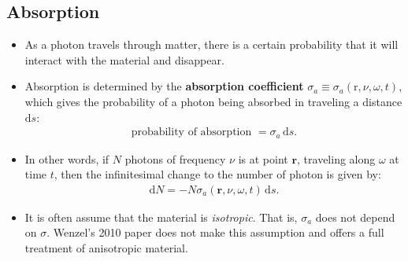 \documentclass[10pt]{article}
\newcommand{\dee}{\mathrm{d}}
\newcommand{\ve}[1]{\mathbf{#1}}
\begin{document}
  \subsection{Absorption}
  \begin{itemize}
    \item As a photon travels through matter, there is a certain probability that it will interact with the material and disappear.

    \item Absorption is determined by the \textbf{absorption coefficient} $\sigma_a \equiv \sigma_a(\mathrm{r}, \nu, \omega, t)$, which gives the probability of a photon being absorbed in traveling a distance $\dee s$:
    \begin{align*}
      \mbox{probability of absorption } = \sigma_a\, \dee s.
    \end{align*}

    \item In other words, if $N$ photons of frequency $\nu$ is at point $\ve{r}$, traveling along $\omega$ at time $t$, then the infinitesimal change to the number of photon is given by:
    \begin{align*}
      \dee N = - N \sigma_a(\ve{r}, \nu, \omega, t)\, \dee s.
    \end{align*}

    \item It is often assume that the material is \emph{isotropic}. That is, $\sigma_a$ does not depend on $\sigma$. Wenzel's 2010 paper \cite{Jakob2010Radiative} does not make this assumption and offers a full treatment of anisotropic material.
  \end{itemize}
\end{document}
